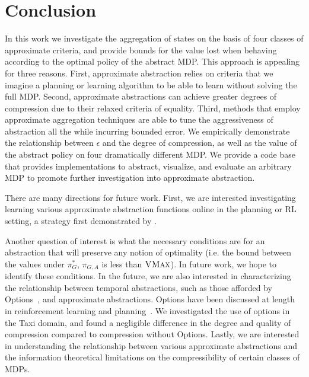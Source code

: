 \section{Conclusion}

In this work we investigate the aggregation of states on the basis of four classes of approximate criteria, and provide bounds for the value lost when behaving according to the optimal policy of the abstract \ac{MDP}. This approach is appealing for three reasons. First, approximate abstraction relies on criteria that we imagine a planning or learning algorithm to be able to learn without solving the full \ac{MDP}. Second, approximate abstractions can achieve greater degrees of compression due to their relaxed criteria of equality. Third, methods that employ approximate aggregation techniques are able to tune the aggressiveness of abstraction all the while incurring bounded error. We empirically demonstrate the relationship between $\epsilon$ and the degree of compression, as well as the value of the abstract policy on four dramatically different \acs{MDP}. We provide a code base that provides implementations to abstract, visualize, and evaluate an arbitrary MDP to promote further investigation into approximate abstraction.

There are many directions for future work.
First, we are interested investigating learning various approximate abstraction functions online in the planning or \ac{RL} setting, a strategy first demonstrated by \citeauthor{ortner2013adaptive}.


Another question of interest is what the necessary conditions are for an abstraction that will preserve any notion of optimality (i.e. the bound between the values under $\pi_G^*$, $\pi_{G,A}$ is less than $\textsc{VMax}$). In future work, we hope to identify these conditions.
In the future, we are also interested in characterizing the relationship between temporal abstractions, such as those afforded by Options~\cite{sutton1999between}, and approximate abstractions. Options have been discussed at length in reinforcement learning and planning~\cite{konidaris2007building,chentanez2004intrinsically}. We investigated the use of options in the Taxi domain, and found a negligible difference in the degree and quality of compression compared to compression without Options.
Lastly, we are interested in understanding the relationship between various approximate abstractions and the information theoretical limitations on the compressibility of certain classes of \acp{MDP}.